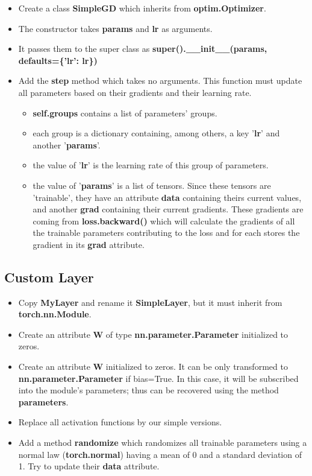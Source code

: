 \documentclass[11pt, a4paper]{article}
\begin{document}
\begin{multicols}{2}
	\begin{itemize}  
		\item Create a class \textbf{SimpleGD} which inherits from \textbf{optim.Optimizer}.
		\item The constructor takes \textbf{params} and \textbf{lr} as arguments. 
		\item It passes them to the super class as \textbf{super().\_\_init\_\_(params, defaults=\{'lr': lr\})}
		\item Add the \textbf{step} method which takes no arguments. 
		This function must update all parameters based on their gradients and their learning rate.
		\begin{itemize}  
			\item \textbf{self.groups} contains a list of parameters' groups.
			\item each group is a dictionary containing, among others, a key '\textbf{lr}' and another '\textbf{params}'.
			\item the value of '\textbf{lr}' is the learning rate of this group of parameters.
			\item the value of '\textbf{params}' is a list of tensors. 
			Since these tensors are 'trainable', they have an attribute \textbf{data} containing theirs current values, and another \textbf{grad} containing their current gradients.
			{\color{red} These gradients are coming from \textbf{loss.backward()} which will calculate the gradients of all the trainable parameters contributing to the loss and for each stores the gradient in its \textbf{grad} attribute}.
		\end{itemize}
	\end{itemize}
	
	\subsection{Custom Layer}
	
	\begin{itemize}  
		\item Copy \textbf{MyLayer} and rename it \textbf{SimpleLayer}, but it must inherit from \textbf{torch.nn.Module}.
		\item Create an attribute \textbf{W} of type \textbf{nn.parameter.Parameter} initialized to zeros.
		\item Create an attribute \textbf{W} initialized to zeros. 
		It can be only transformed to \textbf{nn.parameter.Parameter} if bias=True.
		In this case, it will be subscribed into the module's parameters; thus can be recovered using the method \textbf{parameters}.
		\item Replace all activation functions by our simple versions.
		\item Add a method \textbf{randomize} which randomizes all trainable parameters using a normal law (\textbf{torch.normal}) having a mean of 0 and a standard deviation of 1.
		Try to update their \textbf{data} attribute.
	\end{itemize}
	

\end{multicols}
\end{document}
